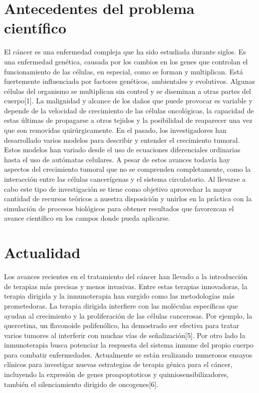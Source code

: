 \section{Antecedentes del problema científico}
\hspace{.1cm}El cáncer es una enfermedad compleja que ha sido estudiada durante siglos. Es una enfermedad genética, causada por los cambios en los genes que controlan el funcionamiento de las células, en especial, como se forman y multiplican. Está fuertemente influenciada por factores genéticos, ambientales y evolutivos. Algunas células del organismo se multiplican sin control y se diseminan a otras partes del cuerpo[1]. La malignidad y alcance de los daños que puede provocar es variable y depende de la velocidad de crecimiento de las células oncológicas, la capacidad de estas últimas de propagarse a otros tejidos y la posibilidad de reaparecer una vez que son removidas quirúrgicamente. En el pasado, los investigadores han desarrollado varios modelos para describir y entender el crecimiento tumoral. Estos modelos han variado desde el uso de ecuaciones diferenciales ordinarias hasta el uso de autómatas celulares. A pesar de estos avances todavía hay aspectos del crecimiento tumoral que no se comprenden completamente, como la interacción entre las células cancerígenas y el sistema circulatorio. Al llevarse a cabo este tipo de investigación se tiene como objetivo aprovechar la mayor cantidad de recursos teóricos a nuestra disposición y unirlos en la práctica con la simulación de procesos biológicos para obtener resultados que favorezcan el avance científico en los campos donde pueda aplicarse.

\section{Actualidad} 
\hspace{.1cm}Los avances recientes en el tratamiento del cáncer han llevado a la introducción de terapias más precisas y menos invasivas. Entre estas terapias innovadoras, la terapia dirigida y la inmunoterapia han surgido como las metodologías más prometedoras. La terapia dirigida interfiere con las moléculas específicas que ayudan al crecimiento y la proliferación de las células cancerosas. Por ejemplo, la quercetina, un flavonoide polifen\'olico, ha demostrado ser efectiva para tratar varios tumores al interferir con muchas vías de señalización[5]. Por otro lado la inmunoterapia busca potenciar la respuesta del sistema inmune del propio cuerpo para combatir enfermedades. Actualmente se están realizando numerosos ensayos clínicos para investigar nuevas estrategias de terapia génica para el cáncer, incluyendo la expresión de genes proapoptoticos y quimiosensibilizadores, también el silenciamiento dirigido de oncogenes[6].

